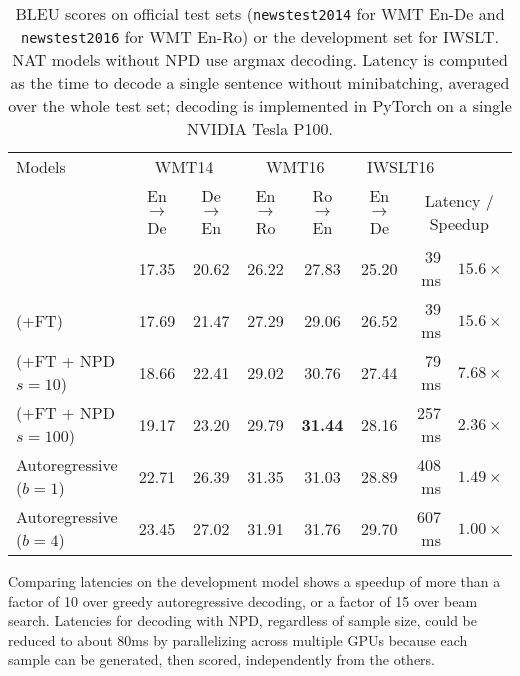 \documentclass{article} \usepackage{iclr2018_conference,times}
\begin{document}
\begin{table}[t]
\small
\centering
    \begin{tabular}{l|cccc|crr}
    \toprule
    Models                  & \multicolumn{2}{c}{WMT14} & \multicolumn{2}{c|}{WMT16} & \multicolumn{2}{c}{IWSLT16} \\
    \multicolumn{1}{c}{}   & \multicolumn{1}{|c}{En$\rightarrow$De} & \multicolumn{1}{c}{De$\rightarrow$En} & \multicolumn{1}{c}{En$\rightarrow$Ro} & \multicolumn{1}{c|}{Ro$\rightarrow$En} & \multicolumn{1}{c}{En$\rightarrow$De} & \multicolumn{2}{c}{Latency / Speedup}  \\
    \midrule


     
         \model{}                       & 17.35 & 20.62& 26.22 & 27.83&  25.20 & 39 ms & $15.6 \times$ \\
         
         \model{} (+FT)                 & 17.69& 21.47 & 27.29 & 29.06&  26.52 & 39 ms & $15.6 \times$\\
         
         
         \model{} (+FT + NPD $s=10$)     & 18.66 & 22.41& 29.02&  30.76 & 27.44 & 79 ms & $7.68 \times$\\
         
         \model{} (+FT + NPD $s=100$)    & 19.17 & 23.20 & 29.79&  \textbf{31.44}     & 28.16 & 257 ms & $2.36 \times$ \\
         \midrule
         Autoregressive ($b=1$)         & 22.71 & 26.39 & 31.35 & 31.03 & 28.89 & 408 ms & $1.49 \times$ \\
    	 Autoregressive ($b=4$)         & 23.45 & 27.02 & 31.91 & 31.76 & 29.70 & 607 ms & $1.00 \times$ \\
    		
    
    \bottomrule
    \end{tabular}
     \caption{BLEU scores on official test sets (\texttt{newstest2014} for WMT En-De and \texttt{newstest2016} for WMT En-Ro) or the development set for IWSLT. NAT models without NPD use argmax decoding. Latency is computed as the time to decode a single sentence without minibatching, averaged over the whole test set; decoding is implemented in PyTorch on a single NVIDIA Tesla P100.}
     \vspace{-10pt}
  \label{tab:bleu}\end{table}

Comparing latencies on the development model shows a speedup of more than a factor of 10 over greedy autoregressive decoding, or a factor of 15 over beam search.  Latencies for decoding with NPD, regardless of sample size, could be reduced to about 80ms by parallelizing across multiple GPUs because each sample can be generated, then scored, independently from the others.
\end{document}
